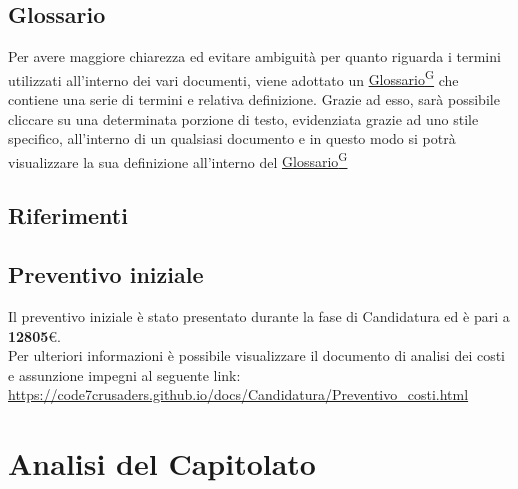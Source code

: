 \documentclass{article}
\begin{document}
    \subsection{Glossario}
    Per avere maggiore chiarezza ed evitare ambiguità per quanto riguarda i termini utilizzati all'interno dei vari documenti,
    viene adottato un \href{https://code7crusaders.github.io/docs/RTB/documentazione_interna/glossario.html#glossario}{Glossario\textsuperscript{G}} che contiene una serie di termini e relativa definizione.
    Grazie ad esso, sarà possibile cliccare su una determinata porzione di testo, evidenziata grazie ad uno stile specifico,
    all'interno di un qualsiasi documento e in questo modo si potrà visualizzare la sua definizione all'interno
    del \href{https://code7crusaders.github.io/docs/RTB/documentazione_interna/glossario.html#glossario}{Glossario\textsuperscript{G}}

    \subsection{Riferimenti}

    \subsection{Preventivo iniziale}
    Il preventivo iniziale è stato presentato durante la fase di Candidatura ed è pari a \textbf{12805}\euro.
    \\ Per ulteriori informazioni è possibile visualizzare il documento di analisi dei costi e assunzione impegni al seguente link:
    \\ \url{https://code7crusaders.github.io/docs/Candidatura/Preventivo_costi.html}




\newpage
\section{Analisi del Capitolato}
\end{document}

